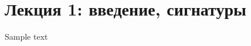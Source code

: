 \documentclass[a4paper,11pt]{article}
\begin{document}
\maketitle

\tableofcontents

\section{Лекция 1: введение, сигнатуры}

\begin{theorem}
	Sample text
\end{theorem}

\end{document}
